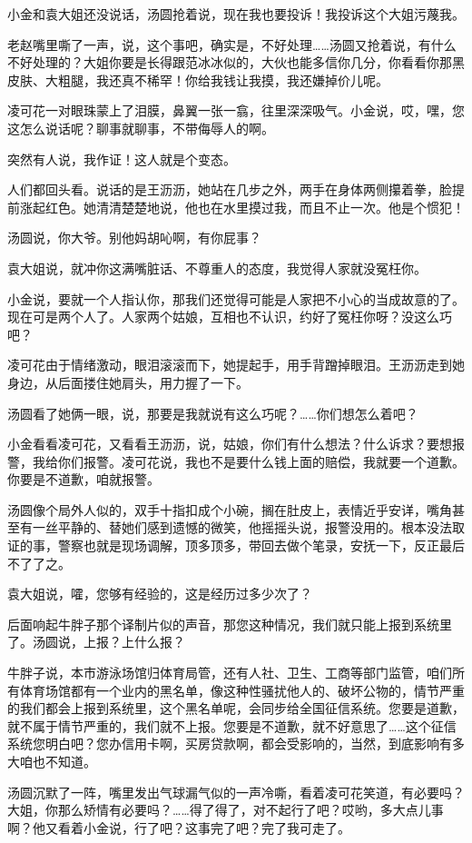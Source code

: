 \documentclass[lang=cn,newtx,12pt,scheme=chinese]{elegantbook}
\begin{document}
小金和袁大姐还没说话，汤圆抢着说，现在我也要投诉！我投诉这个大姐污蔑我。

老赵嘴里嘶了一声，说，这个事吧，确实是，不好处理……汤圆又抢着说，有什么不好处理的？大姐你要是长得跟范冰冰似的，大伙也能多信你几分，你看看你那黑皮肤、大粗腿，我还真不稀罕！你给我钱让我摸，我还嫌掉价儿呢。

凌可花一对眼珠蒙上了泪膜，鼻翼一张一翕，往里深深吸气。小金说，哎，嘿，您这怎么说话呢？聊事就聊事，不带侮辱人的啊。

突然有人说，我作证！这人就是个变态。

人们都回头看。说话的是王沥沥，她站在几步之外，两手在身体两侧攥着拳，脸提前涨起红色。她清清楚楚地说，他也在水里摸过我，而且不止一次。他是个惯犯！

汤圆说，你大爷。别他妈胡吣啊，有你屁事？

袁大姐说，就冲你这满嘴脏话、不尊重人的态度，我觉得人家就没冤枉你。

小金说，要就一个人指认你，那我们还觉得可能是人家把不小心的当成故意的了。现在可是两个人了。人家两个姑娘，互相也不认识，约好了冤枉你呀？没这么巧吧？

凌可花由于情绪激动，眼泪滚滚而下，她提起手，用手背蹭掉眼泪。王沥沥走到她身边，从后面搂住她肩头，用力握了一下。

汤圆看了她俩一眼，说，那要是我就说有这么巧呢？……你们想怎么着吧？

小金看看凌可花，又看看王沥沥，说，姑娘，你们有什么想法？什么诉求？要想报警，我给你们报警。凌可花说，我也不是要什么钱上面的赔偿，我就要一个道歉。你要是不道歉，咱就报警。

汤圆像个局外人似的，双手十指扣成个小碗，搁在肚皮上，表情近乎安详，嘴角甚至有一丝平静的、替她们感到遗憾的微笑，他摇摇头说，报警没用的。根本没法取证的事，警察也就是现场调解，顶多顶多，带回去做个笔录，安抚一下，反正最后不了了之。

袁大姐说，嚯，您够有经验的，这是经历过多少次了？

后面响起牛胖子那个译制片似的声音，那您这种情况，我们就只能上报到系统里了。汤圆说，上报？上什么报？

牛胖子说，本市游泳场馆归体育局管，还有人社、卫生、工商等部门监管，咱们所有体育场馆都有一个业内的黑名单，像这种性骚扰他人的、破坏公物的，情节严重的我们都会上报到系统里，这个黑名单呢，会同步给全国征信系统。您要是道歉，就不属于情节严重的，我们就不上报。您要是不道歉，就不好意思了……这个征信系统您明白吧？您办信用卡啊，买房贷款啊，都会受影响的，当然，到底影响有多大咱也不知道。

汤圆沉默了一阵，嘴里发出气球漏气似的一声冷嘶，看着凌可花笑道，有必要吗？大姐，你那么矫情有必要吗？……得了得了，对不起行了吧？哎哟，多大点儿事啊？他又看着小金说，行了吧？这事完了吧？完了我可走了。
\end{document}
